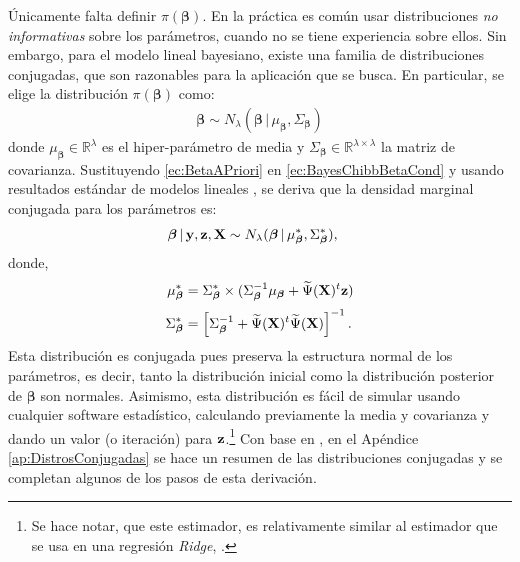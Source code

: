 \documentclass[../Main/Main.tex]{subfiles}
\begin{document}
Únicamente falta definir $\pi(\bm{\beta})$. En la práctica es común usar distribuciones \textit{no informativas} sobre los parámetros, cuando no se tiene experiencia sobre ellos. Sin embargo, para el modelo lineal bayesiano, existe una familia de distribuciones conjugadas, que son razonables para la aplicación que se busca. En particular, se elige la distribución $\pi(\bm{\beta})$ como:
\begin{align}
	\bm{\beta} \sim N_{\lambda}(\bm{\beta}\,|\,\mu_{\bm{\beta}}, \Sigma_{\bm{\beta}}) \label{ec:BetaAPriori}
\end{align}
donde $\mu_{\bm{\beta}}\in \mathbb{R}^{\lambda}$ es el hiper-parámetro de media y $\Sigma_{\bm{\beta}} \in \mathbb{R}^{\lambda \times \lambda}$ la matriz de covarianza. Sustituyendo \eqref{ec:BetaAPriori} en \eqref{ec:BayesChibbBetaCond} y usando resultados estándar de modelos lineales \autocite{banerjee2008gory}, se deriva que la densidad marginal conjugada para los parámetros es:
\begin{align}
	\bm{\beta}\,|\,\mathbf{y},\mathbf{z},\mathbf{X} &\sim N_{\lambda}(\bm{\beta}\,|\,\mu_{\bm{\beta}}^*, \Sigma_{\bm{\beta}}^*), \label{ec:SimBeta}
\end{align}	
donde,
\begin{align*}
	\mu_{\bm{\beta}}^* &= \Sigma_{\bm{\beta}}^* \times (\Sigma_{\bm{\beta}}^{-1}\mu_{\bm{\beta}} + \widetilde{\Psi}(\mathbf{X})^t\mathbf{z} )\nonumber \\[2pt]
	 \Sigma_{\bm{\beta}}^* &= \left[\Sigma_{\bm{\beta}}^{-1} + \widetilde{\Psi}(\mathbf{X})^t\widetilde{\Psi}(\mathbf{X})\right]^{-1}.\nonumber
\end{align*}	 
Esta distribución es conjugada pues preserva la estructura normal de los parámetros, es decir, tanto la distribución inicial como la distribución posterior de $\bm{\beta}$ son normales. Asimismo, esta distribución es fácil de simular usando cualquier software estadístico, calculando previamente la media y covarianza y dando un valor (o iteración) para $\mathbf{z}$.\footnote{Se hace notar, que este estimador, es relativamente similar al estimador que se usa en una regresión \textit{Ridge}, \autocite{tibshirani1996regression}.} Con base en \citet{banerjee2008gory}, en el Apéndice \ref{ap:DistrosConjugadas} se hace un resumen de las distribuciones conjugadas y se completan algunos de los pasos de esta derivación. 
\end{document}
